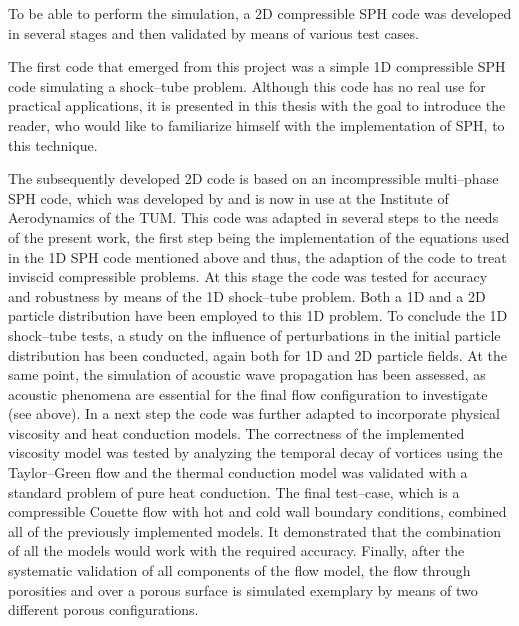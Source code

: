 \documentclass{report}
\begin{document}
To be able to perform the simulation, a 2D compressible SPH code was developed in several stages and then validated by means of various test cases.

The first code that emerged from this project was a simple 1D compressible SPH code simulating a shock--tube problem. Although this code has no real use for practical applications, it is presented in this thesis with the goal to introduce the reader, who would like to familiarize himself with the implementation of SPH, to this technique.

The subsequently developed 2D code is based on an incompressible multi--phase SPH code, which was developed by \cite{Hu2006} and is now in use at the Institute of Aerodynamics of the TUM. This code was adapted in several steps to the needs of the present work, the first step being the implementation of the equations used in the 1D SPH code mentioned above and thus, the adaption of the code to treat inviscid compressible problems. At this stage the code was tested for accuracy and robustness by means of the 1D shock--tube problem. Both a 1D and a 2D particle distribution have been employed to this 1D problem. To conclude the 1D shock--tube tests, a study on the influence of perturbations in the initial particle distribution has been conducted, again both for 1D and 2D particle fields.
At the same point, the simulation of acoustic wave propagation has been assessed, as acoustic phenomena are essential for the final flow configuration to investigate (see above).
In a next step the code was further adapted to incorporate physical viscosity and heat conduction models. The correctness of the implemented viscosity model was tested by analyzing the temporal decay of vortices using the Taylor--Green flow and the thermal conduction model was validated with a standard problem of pure heat conduction.
The final test--case, which is a compressible Couette flow with hot and cold wall boundary conditions, combined all of the previously implemented models. It demonstrated that the combination of all the models would work with the required accuracy.
Finally, after the systematic validation of all components of the flow model, the flow through porosities and over a porous surface is simulated exemplary by means of two different porous configurations. 
\end{document}

